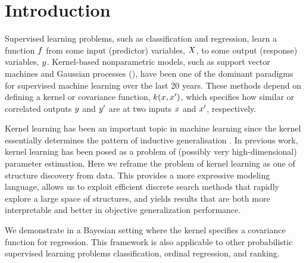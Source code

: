 \documentclass[twoside]{article}
\begin{document}
\section{Introduction}

Supervised learning problems, such as classification and regression, learn a function $f$ from some input (predictor) variables, $X$, to some output (response) variables, $y$.
Kernel-based nonparametric models, such as support vector machines and Gaussian processes (\gp{}), have been one of the dominant paradigms for supervised machine learning over the last 20 years.
These methods depend on defining a kernel or covariance function, $k(x,x')$, which specifies how similar or correlated outputs $y$ and $y'$ are at two inputs $x$ and $x'$, respectively.

Kernel learning has been an important topic in machine learning since the kernel essentially determines the pattern of inductive
generalisation \citep[e.g.][]{diosan2007evolving,salakhutdinov2008using,Bach_HKL}.
In previous work, kernel learning has been posed as a problem of (possibly very high-dimensional) parameter estimation.
Here we reframe the problem of kernel learning as one of structure discovery from data.
This provides a more expressive modeling language, allows us to exploit efficient discrete search methods that rapidly explore a large space of structures, and yields results that are both more interpretable and better in objective generalization performance.

We demonstrate  in a Bayesian setting where the kernel specifies a covariance function for \gp{} regression.
This framework is also applicable to other probabilistic supervised learning problems \eg classification, ordinal regression, and ranking.
\end{document}
